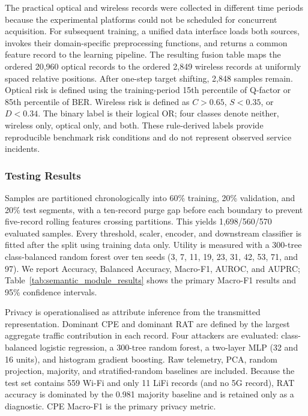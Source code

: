 \documentclass[9pt,twocolumn,twoside]{osajnl}
\begin{document}
The practical optical and wireless records were collected in different time periods because the experimental platforms could not be scheduled for concurrent acquisition. For subsequent training, a unified data interface loads both sources, invokes their domain-specific preprocessing functions, and returns a common feature record to the learning pipeline. The resulting fusion table maps the ordered 20,960 optical records to the ordered 2,849 wireless records at uniformly spaced relative positions. After one-step target shifting, 2,848 samples remain. Optical risk is defined using the training-period 15th percentile of Q-factor or 85th percentile of BER. Wireless risk is defined as $C>0.65$, $S<0.35$, or $D<0.34$. The binary label is their logical OR; four classes denote neither, wireless only, optical only, and both. These rule-derived labels provide reproducible benchmark risk conditions and do not represent observed service incidents.


\subsubsection{Testing Results}

Samples are partitioned chronologically into 60\% training, 20\% validation, and 20\% test segments, with a ten-record purge gap before each boundary to prevent five-record rolling features crossing partitions. This yields 1,698/560/570 evaluated samples. Every threshold, scaler, encoder, and downstream classifier is fitted after the split using training data only. Utility is measured with a 300-tree class-balanced random forest over ten seeds (3, 7, 11, 19, 23, 31, 42, 53, 71, and 97). We report Accuracy, Balanced Accuracy, Macro-F1, AUROC, and AUPRC; Table~\ref{tab:semantic_module_results} shows the primary Macro-F1 results and 95\% confidence intervals.

Privacy is operationalised as attribute inference from the transmitted representation. Dominant CPE and dominant RAT are defined by the largest aggregate traffic contribution in each record. Four attackers are evaluated: class-balanced logistic regression, a 300-tree random forest, a two-layer MLP (32 and 16 units), and histogram gradient boosting. Raw telemetry, PCA, random projection, majority, and stratified-random baselines are included. Because the test set contains 559 Wi-Fi and only 11 LiFi records (and no 5G record), RAT accuracy is dominated by the 0.981 majority baseline and is retained only as a diagnostic. CPE Macro-F1 is the primary privacy metric.
\end{document}

